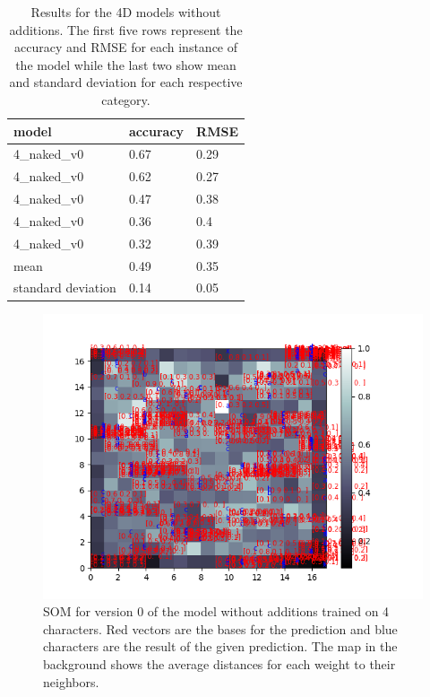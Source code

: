 \begin{table}[!htb]
	\centering
	\caption{Results for the 4D models without additions. The first five rows represent the accuracy and RMSE for each instance of the model while the last two show mean and standard deviation for each respective category.}
	\begin{tabularx}{\textwidth}{ X  X  X }
		\hline
		model & accuracy & RMSE \\ 
		\hline
		4\_naked\_v0 & 0.67 & 0.29 \\
		4\_naked\_v0 & 0.62 & 0.27 \\
		4\_naked\_v0 & 0.47 & 0.38 \\
		4\_naked\_v0 & 0.36 & 0.4  \\
		4\_naked\_v0 & 0.32 & 0.39 \\
		\hline 
		mean & 0.49 & 0.35  \\
		standard deviation & 0.14 & 0.05 \\
		\hline
	\end{tabularx}
	\label{table:4_naked}
\end{table}


\begin{figure}[!htb]
	\centering
	\includegraphics[width=\textwidth]{images/SOM_graphics/17x17_4d_naked_v0/all.png}
	\caption{SOM for version 0 of the model without additions trained on 4 characters. Red vectors are the bases for the prediction and blue characters are the result of the given prediction. The map in the background shows the average distances for each weight to their neighbors.}
	\label{fig:4d_naked_all}
\end{figure}

